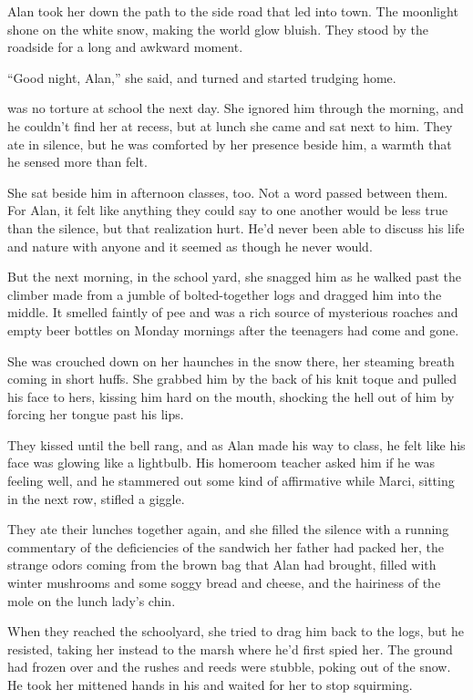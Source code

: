Alan took her down the path to the side road that led into town.  The
moonlight shone on the white snow, making the world glow bluish.  They
stood by the roadside for a long and awkward moment.

``Good night, Alan,'' she said, and turned and started trudging home.

 was no torture at school the next day.  She ignored him through
the morning, and he couldn't find her at recess, but at lunch she came
and sat next to him.  They ate in silence, but he was comforted by her
presence beside him, a warmth that he sensed more than felt.

She sat beside him in afternoon classes, too.  Not a word passed
between them.  For Alan, it felt like anything they could say to one
another would be less true than the silence, but that realization
hurt.  He'd never been able to discuss his life and nature with anyone
and it seemed as though he never would.

But the next morning, in the school yard, she snagged him as he walked
past the climber made from a jumble of bolted-together logs and
dragged him into the middle.  It smelled faintly of pee and was a rich
source of mysterious roaches and empty beer bottles on Monday mornings
after the teenagers had come and gone.

She was crouched down on her haunches in the snow there, her steaming
breath coming in short huffs.  She grabbed him by the back of his knit
toque and pulled his face to hers, kissing him hard on the mouth,
shocking the hell out of him by forcing her tongue past his lips.

They kissed until the bell rang, and as Alan made his way to class, he
felt like his face was glowing like a lightbulb.  His homeroom teacher
asked him if he was feeling well, and he stammered out some kind of
affirmative while Marci, sitting in the next row, stifled a giggle.

They ate their lunches together again, and she filled the silence with
a running commentary of the deficiencies of the sandwich her father
had packed her, the strange odors coming from the brown bag that Alan
had brought, filled with winter mushrooms and some soggy bread and
cheese, and the hairiness of the mole on the lunch lady's chin.

When they reached the schoolyard, she tried to drag him back to the
logs, but he resisted, taking her instead to the marsh where he'd
first spied her.  The ground had frozen over and the rushes and reeds
were stubble, poking out of the snow.  He took her mittened hands in
his and waited for her to stop squirming.

